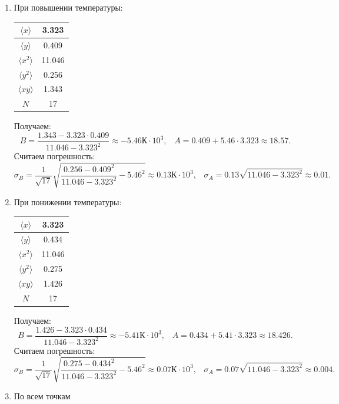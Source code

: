 \documentclass[a4paper,12pt]{article} %
\begin{document}
\begin{enumerate}
\item При повышении температуры:
\begin{center}
\begin{tabular}{|c|c|}
\hline 
$\langle x \rangle$ & 3.323 \\ 
\hline 
$\langle y \rangle$ & 0.409 \\ 
\hline 
$\langle x^2 \rangle$ & 11.046 \\ 
\hline 
$\langle y^2 \rangle$ & 0.256 \\ 
\hline 
$\langle xy \rangle$ & 1.343 \\ 
\hline 
$N$ & 17 \\ 
\hline 
\end{tabular} 
\end{center}

Получаем:
\[
B = \frac{1.343 - 3.323 \cdot 0.409}{11.046 - 3.323^2} \approx -5.46 \text{К}\cdot 10^3, \;\;\;
A = 0.409 + 5.46 \cdot 3.323 \approx 18.57.
\]
Считаем погрешность:
\[
\sigma_B = \frac{1}{\sqrt{17}} \sqrt{\frac{0.256 - 0.409^2}{11.046 - 3.323^2} - 5.46^2} \approx 0.13 \text{К}\cdot 10^3, \;\;\; \sigma_A = 0.13 \sqrt{11.046 - 3.323^2} \approx 0.01.
\]

\item При понижении температуры:

\begin{center}
\begin{tabular}{|c|c|}
\hline 
$\langle x \rangle$ & 3.323 \\ 
\hline 
$\langle y \rangle$ & 0.434 \\ 
\hline 
$\langle x^2 \rangle$ & 11.046 \\ 
\hline 
$\langle y^2 \rangle$ & 0.275 \\ 
\hline 
$\langle xy \rangle$ & 1.426 \\ 
\hline 
$N$ & 17 \\ 
\hline 
\end{tabular} 
\end{center}

Получаем:
\[
B = \frac{1.426 - 3.323 \cdot 0.434}{11.046 - 3.323^2} \approx -5.41 \text{К}\cdot 10^3, \;\;\;
A = 0.434 + 5.41 \cdot 3.323 \approx 18.426.
\]
Считаем погрешность:
\[
\sigma_B = \frac{1}{\sqrt{17}} \sqrt{\frac{0.275 - 0.434^2}{11.046 - 3.323^2} - 5.46^2} \approx 0.07 \text{К}\cdot 10^3, \;\;\; \sigma_A = 0.07 \sqrt{11.046 - 3.323^2} \approx 0.004.
\]

\item По всем точкам


\end{enumerate}
\end{document}
